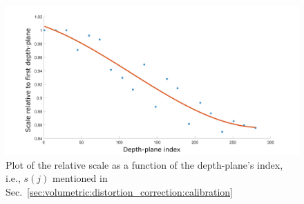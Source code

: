 \begin{figure} [ht]
\begin{center}
\includegraphics[width=\textwidth]{images/volumetric/distortion_correction/scale_v_depth}
\end{center}
\caption[Volumetric NED: Relative scale as a function of depth]{Plot of the relative scale as a function of the depth-plane's index, i.e., $s(j)$ mentioned in Sec.~\ref{sec:volumetric:distortion_correction:calibration}}
\label{fig:volumetric:distortion_correction:scale_v_depth} 
\end{figure} 
